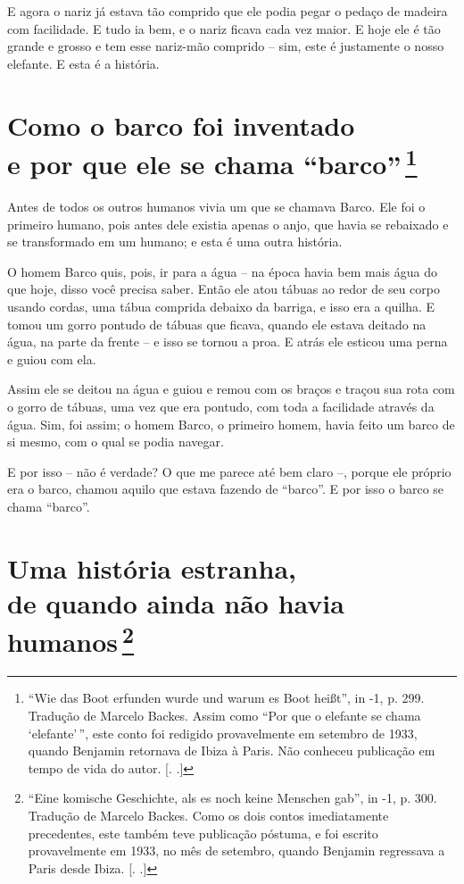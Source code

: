 E agora o nariz já estava tão comprido que ele podia pegar o pedaço de
madeira com facilidade. E tudo ia bem, e o nariz ficava cada vez maior.
E hoje ele é tão grande e grosso e tem esse nariz-mão comprido -- sim,
este é justamente o nosso elefante. E esta é a história.

\chapter{Como o barco foi inventado \\e por que ele se chama ``barco''\,\footnote[*]{``Wie
  das Boot erfunden wurde und warum es Boot heißt'', in  -1, p.
  299. Tradução de Marcelo Backes. Assim como ``Por que o elefante se
      chama `elefante'\,'', este conto foi redigido provavelmente em setembro
  de 1933, quando Benjamin retornava de Ibiza à Paris. Não conheceu
  publicação em tempo de vida do autor. [. .]} }

Antes de todos os outros humanos vivia um que se chamava Barco. Ele foi
o primeiro humano, pois antes dele existia apenas o anjo, que havia se
rebaixado e se transformado em um humano; e esta é uma outra história.

O homem Barco quis, pois, ir para a água -- na época havia bem mais água
do que hoje, disso você precisa saber. Então ele atou tábuas ao redor de
seu corpo usando cordas, uma tábua comprida debaixo da barriga, e isso
era a quilha. E tomou um gorro pontudo de tábuas que ficava, quando ele
estava deitado na água, na parte da frente -- e isso se tornou a proa. E
atrás ele esticou uma perna e guiou com ela.

Assim ele se deitou na água e guiou e remou com os braços e traçou sua
rota com o gorro de tábuas, uma vez que era pontudo, com toda a
facilidade através da água. Sim, foi assim; o homem Barco, o primeiro
homem, havia feito um barco de si mesmo, com o qual se podia navegar.

E por isso -- não é verdade? O que me parece até bem claro --, porque
ele próprio era o barco, chamou aquilo que estava fazendo de ``barco''.
E por isso o barco se chama ``barco''.

\chapter{Uma história estranha, \\de quando ainda não havia humanos\,\footnote[*]{``Eine komische Geschichte, als es noch keine
  Menschen gab'', in  -1, p. 300. Tradução de Marcelo Backes. Como
  os dois contos imediatamente precedentes, este também teve publicação
  póstuma, e foi escrito provavelmente em 1933, no mês de setembro,
  quando Benjamin regressava a Paris desde Ibiza. [. .]} }

